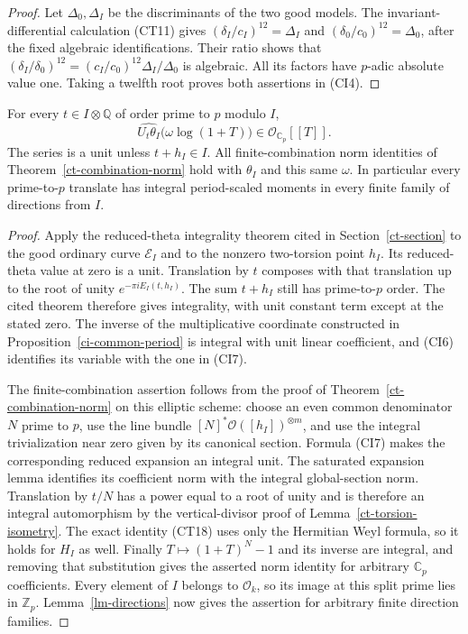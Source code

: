 \begin{proof}
Let $\Delta_0,\Delta_I$ be the discriminants of the two good
models.  The invariant-differential calculation (CT11) gives
$(\delta_I/c_I)^{12}=\Delta_I$ and
$(\delta_0/c_0)^{12}=\Delta_0$, after the fixed algebraic
identifications.  Their ratio shows that
$(\delta_I/\delta_0)^{12}
=(c_I/c_0)^{12}\Delta_I/\Delta_0$ is algebraic.
All its factors have $p$-adic absolute value one.
Taking a twelfth root proves both assertions in (CI4).
\end{proof}

\begin{theorem}\label{ci-integral-translates}
For every $t\in I\otimes\mathbb Q$ of order prime to $p$
modulo $I$,
\[
                     \widehat{U_t\theta_I}
                           \bigl(\omega\log(1+T)\bigr)
                         \in\mathcal O_{\mathbb C_p}[[T]].
 \tag{CI7}
\]
The series is a unit unless $t+h_I\in I$.
All finite-combination norm identities of
Theorem~\ref{ct-combination-norm} hold with $\theta_I$ and
this same $\omega$.
In particular every prime-to-$p$ translate has integral
period-scaled moments in every finite family of directions
from $I$.
\end{theorem}
\begin{proof}
Apply the reduced-theta integrality theorem cited in
Section~\ref{ct-section} to the good ordinary curve
$\mathscr E_I$ and to the nonzero two-torsion point $h_I$.
Its reduced-theta value at zero is a unit.  Translation
by $t$ composes with that translation up to the root of
unity $e^{-\pi iE_I(t,h_I)}$.
The sum $t+h_I$ still has prime-to-$p$ order.
The cited theorem therefore gives integrality, with unit
constant term except at the stated zero.
The inverse of the multiplicative coordinate constructed
in Proposition~\ref{ci-common-period} is integral with
unit linear coefficient, and (CI6) identifies its variable
with the one in (CI7).

The finite-combination assertion follows from the proof of
Theorem~\ref{ct-combination-norm} on this elliptic scheme:
choose an even common denominator $N$ prime to $p$, use the
line bundle $[N]^*\mathcal O([h_I])^{\otimes m}$, and use
the integral trivialization near zero given by its canonical
section.  Formula (CI7) makes the corresponding reduced
expansion an integral unit.  The saturated expansion lemma
identifies its coefficient norm with the integral
global-section norm.  Translation by $t/N$ has a power
equal to a root of unity and is therefore an integral
automorphism by the vertical-divisor proof of
Lemma~\ref{ct-torsion-isometry}.
The exact identity (CT18) uses only the Hermitian Weyl
formula, so it holds for $H_I$ as well.
Finally $T\mapsto(1+T)^N-1$ and its inverse are integral,
and removing that substitution gives the asserted norm
identity for arbitrary $\mathbb C_p$ coefficients.
Every element of $I$ belongs to $\mathcal O_k$, so its
image at this split prime lies in $\mathbb Z_p$.
Lemma~\ref{lm-directions} now gives the assertion for
arbitrary finite direction families.
\end{proof}

